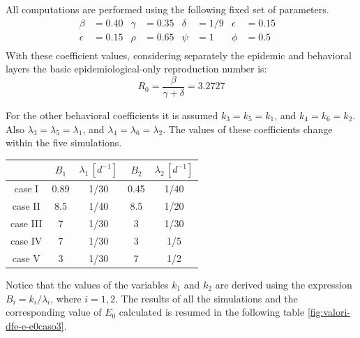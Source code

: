 All computations are performed using the following fixed set of parameters.
\begin{align*}
\beta &= 0.40  &\gamma &= 0.35 & \delta &= 1/9 &  \epsilon &= 0.15 &\\
\epsilon &= 0.15 & \rho &= 0.65  &\psi &= 1 & \phi &= 0.5 &   \\	
\end{align*}
With these coefficient values, considering separately the epidemic and behavioral layers the basic epidemiological-only reproduction number is:
 \begin{equation*}
 	R_0= \frac{\beta}{\gamma+\delta} = 3.2727 
 \end{equation*}
 
For the other behavioral coefficients it is assumed $k_3 = k_5 = k_1$, and $k_4 = k_6 = k_2$. Also $\lambda_3 = \lambda_5 = \lambda_1$, and  $\lambda_4 = \lambda_6 = \lambda_2$. 
The values of these coefficients change within the five simulations.
\begin{center}
 \begin{tabular}{|c|c|c|c|c|}
 	\hline
 	& $B_1$ & $\lambda_1 \,[d^{-1}]$ & $B_2$ & $\lambda_2 \, [d^{-1}]$ \\
 	\hline
 	case I & 0.89 & 1/30 & 0.45 & 1/40 \\
 	\hline
 	case II & 8.5 & 1/40 & 8.5 & 1/20 \\
 	\hline
 	case III & 7 & 1/30 & 3 & 1/30 \\
 	\hline
 	case IV & 7 & 1/30 & 3 & 1/5 \\
 	\hline
 	case V & 3 & 1/30 & 7 & 1/2 \\
 	\hline
 \end{tabular}
\end{center}
Notice that the values of the variables $k_1$ and $k_2$ are derived using the expression $B_i = k_i/\lambda_i$, where $i = 1, 2$.
The results of all the simulations and the corresponding value of $E_0$ calculated is resumed in the following table \ref{fig:valori-dfe-e-e0caso3}.

